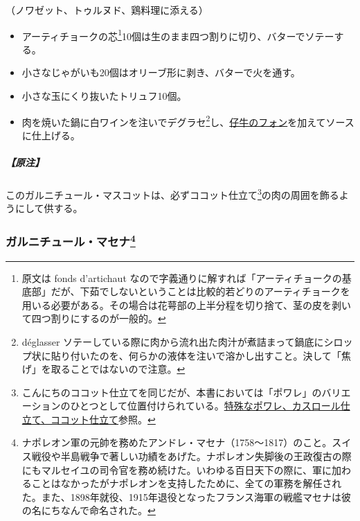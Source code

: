 \begin{recette}


（ノワゼット、トゥルヌド、鶏料理に添える）

\begin{itemize}
\item
  アーティチョークの芯\footnote{原文は fonds d'artichaut
    なので字義通りに解すれば「アーティチョークの基底部」だが、下茹でしないということは比較的若どりのアーティチョークを用いる必要がある。その場合は花萼部の上半分程を切り捨て、茎の皮を剥いて四つ割りにするのが一般的。}10個は生のまま四つ割りに切り、バターでソテーする。
\item
  小さなじゃがいも20個はオリーブ形に剥き、バターで火を通す。
\item
  小さな玉にくり抜いたトリュフ10個。
\item
  肉を焼いた鍋に白ワインを注いでデグラセ\footnote{déglasser
    ソテーしている際に肉から流れ出た肉汁が煮詰まって鍋底にシロップ状に貼り付いたのを、何らかの液体を注いで溶かし出すこと。決して「焦げ」を取ることではないので注意。}し、\protect\hyperlink{fonds-de-veau-brun}{仔牛のフォン}を加えてソースに仕上げる。
\end{itemize}

\hypertarget{nota-garniture-mascotte}{%
\subparagraph{【原注】}\label{nota-garniture-mascotte}}

このガルニチュール・マスコットは、必ずココット仕立て\footnote{こんにちのココット仕立てを同じだが、本書においては「ポワレ」のバリエーションのひとつとして位置付けられている。\protect\hyperlink{poeles-speciaux-dits-en-casserole-ou-en-cocotte}{特殊なポワレ、カスロール仕立て、ココット仕立て}参照。}の肉の周囲を飾るようにして供する。

\hypertarget{garniture-massena}{%
\subsubsection[ガルニチュール・マセナ]{\texorpdfstring{ガルニチュール・マセナ\footnote{ナポレオン軍の元帥を務めたアンドレ・マセナ（1758〜1817）のこと。スイス戦役や半島戦争で著しい功績をあげた。ナポレオン失脚後の王政復古の際にもマルセイユの司令官を務め続けた。いわゆる百日天下の際に、軍に加わることはなかったがナポレオンを支持したために、全ての軍務を解任された。また、1898年就役、1915年退役となったフランス海軍の戦艦マセナは彼の名にちなんで命名された。}}{ガルニチュール・マセナ}}\label{garniture-massena}}


\end{recette}
